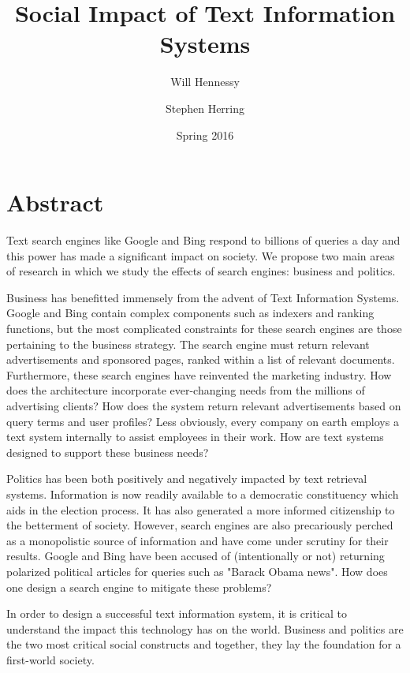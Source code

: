 \documentclass[11pt]{article}
\title{Social Impact of Text Information Systems}
\author{Will Hennessy \and Stephen Herring}
\date{Spring 2016}
\begin{document}
\maketitle

\section*{Abstract}
Text search engines like Google and Bing respond to billions of queries a day and this power has made a significant impact on society. We propose two main areas of research in which we study the effects of search engines:  business and politics.

Business has benefitted immensely from the advent of Text Information Systems. Google and Bing contain complex components such as indexers and ranking functions, but the most complicated constraints for these search engines are those pertaining to the business strategy. The search engine must return relevant advertisements and sponsored pages, ranked within a list of relevant documents. Furthermore, these search engines have reinvented the marketing industry. How does the architecture incorporate ever-changing needs from the millions of advertising clients? How does the system return relevant advertisements based on query terms and user profiles? Less obviously, every company on earth employs a text system internally to assist employees in their work. How are text systems designed to support these business needs?

Politics has been both positively and negatively impacted by text retrieval systems. Information is now readily available to a democratic constituency which aids in the election process. It has also generated a more informed citizenship to the betterment of society. However, search engines are also precariously perched as a monopolistic source of information and have come under scrutiny for their results. Google and Bing have been accused of (intentionally or not) returning polarized political articles for queries such as "Barack Obama news". How does one design a search engine to mitigate these problems?

In order to design a successful text information system, it is critical to understand the impact this technology has on the world. Business and politics are the two most critical social constructs and together, they lay the foundation for a first-world society.



\end{document}
